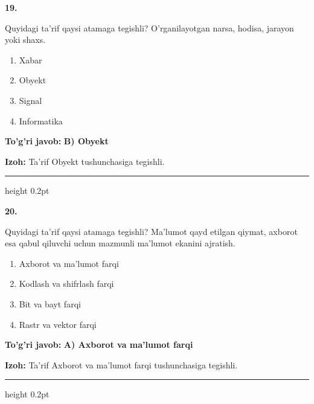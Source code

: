 \documentclass[10pt,a4paper,oneside]{article}
\begin{document}
\noindent\textbf{\color{ink}19.}
\par
Quyidagi ta'rif qaysi atamaga tegishli? O'rganilayotgan narsa, hodisa, jarayon yoki shaxs.
\begin{enumerate}[label=\Alph*),leftmargin=9mm]
\item Xabar
\item Obyekt
\item Signal
\item Informatika
\end{enumerate}
\begin{tcolorbox}[enhanced,breakable,colback=teal!4,colframe=teal!50!black,boxrule=0.5pt,arc=1.1mm,left=3mm,right=3mm,top=1.7mm,bottom=1.7mm,before skip=2mm,after skip=2mm]
\textbf{\color{teal}To'g'ri javob:} \textbf{B) Obyekt}
\par\smallskip
\textbf{Izoh:} Ta'rif Obyekt tushunchasiga tegishli.
\end{tcolorbox}
\vspace{2mm}\hrule height 0.2pt \vspace{3mm}

\noindent\textbf{\color{ink}20.}
\par
Quyidagi ta'rif qaysi atamaga tegishli? Ma'lumot qayd etilgan qiymat, axborot esa qabul qiluvchi uchun mazmunli ma'lumot ekanini ajratish.
\begin{enumerate}[label=\Alph*),leftmargin=9mm]
\item Axborot va ma'lumot farqi
\item Kodlash va shifrlash farqi
\item Bit va bayt farqi
\item Rastr va vektor farqi
\end{enumerate}
\begin{tcolorbox}[enhanced,breakable,colback=teal!4,colframe=teal!50!black,boxrule=0.5pt,arc=1.1mm,left=3mm,right=3mm,top=1.7mm,bottom=1.7mm,before skip=2mm,after skip=2mm]
\textbf{\color{teal}To'g'ri javob:} \textbf{A) Axborot va ma'lumot farqi}
\par\smallskip
\textbf{Izoh:} Ta'rif Axborot va ma'lumot farqi tushunchasiga tegishli.
\end{tcolorbox}
\vspace{2mm}\hrule height 0.2pt \vspace{3mm}
\end{document}
